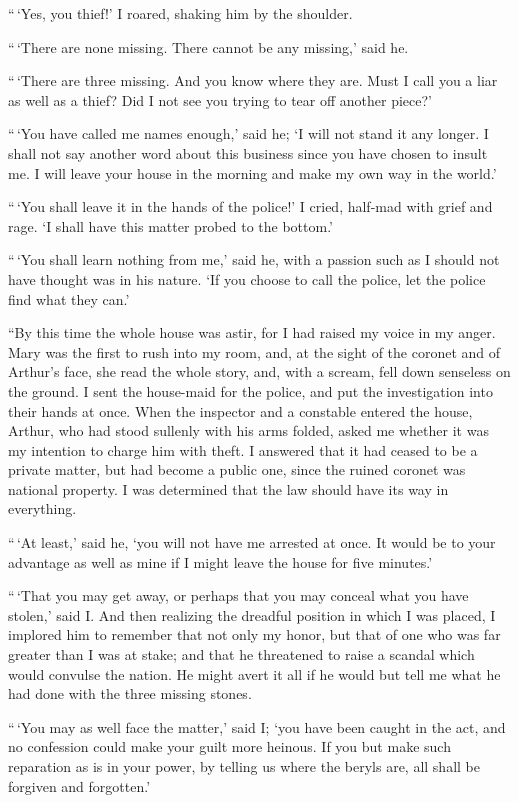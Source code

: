“\,‘Yes, you thief!’ I roared, shaking him by the shoulder.

“\,‘There are none missing. There cannot be any missing,’
said he.

“\,‘There are three missing. And you know where they are.
Must I call you a liar as well as a thief? Did I not see you
trying to tear off another piece?’

“\,‘You have called me names enough,’ said he; ‘I will not
stand it any longer. I shall not say another word about this
business since you have chosen to insult me. I will leave
your house in the morning and make my own way in the
world.’

“\,‘You shall leave it in the hands of the police!’ I cried,
half-mad with grief and rage. ‘I shall have this matter
probed to the bottom.’

“\,‘You shall learn nothing from me,’ said he, with a passion
such as I should not have thought was in his nature.
‘If you choose to call the police, let the police find what
they can.’

“By this time the whole house was astir, for I had raised
my voice in my anger. Mary was the first to rush into my
room, and, at the sight of the coronet and of Arthur’s face,
she read the whole story, and, with a scream, fell down senseless
on the ground. I sent the house-maid for the police, and
put the investigation into their hands at once. When the
inspector and a constable entered the house, Arthur, who had
stood sullenly with his arms folded, asked me whether it was
my intention to charge him with theft. I answered that it
had ceased to be a private matter, but had become a public
one, since the ruined coronet was national property. I was
determined that the law should have its way in everything.

“\,‘At least,’ said he, ‘you will not have me arrested at once.
It would be to your advantage as well as mine if I might leave
the house for five minutes.’

“\,‘That you may get away, or perhaps that you may conceal
what you have stolen,’ said I. And then realizing the
dreadful position in which I was placed, I implored him to
remember that not only my honor, but that of one who was
far greater than I was at stake; and that he threatened to
raise a scandal which would convulse the nation. He might
avert it all if he would but tell me what he had done with the
three missing stones.

“\,‘You may as well face the matter,’ said I; ‘you have
been caught in the act, and no confession could make your
guilt more heinous. If you but make such reparation as is in
your power, by telling us where the beryls are, all shall be
forgiven and forgotten.’


